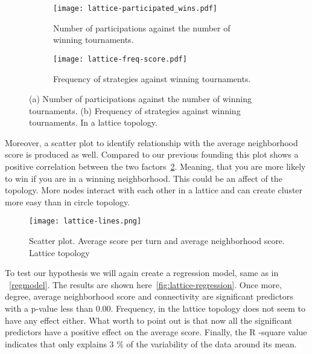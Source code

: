 \begin{figure}[h!]
\hspace*{-2cm}
    \begin{subfigure}[t]{1.2\textwidth}
    \centering
        \texttt{[image: lattice-participated\_wins.pdf]}
    \caption{Number of participations against the number of winning tournaments.}
    \end{subfigure}
\hfill
\hspace*{-2cm}
    \begin{subfigure}[t]{1.2\textwidth}\centering
    \centering
        \texttt{[image: lattice-freq-score.pdf]}
    \caption{Frequency of strategies against winning tournaments.}
    \end{subfigure}
\caption{(a) Number of participations against the number of winning tournaments.
         (b) Frequency of strategies against winning tournaments. In a lattice
         topology.}
\label{fig:lattice-part-wins}
\end{figure}

\newpage

Moreover, a scatter plot to identify relationship with the average neighborhood
score is produced as well. Compared to our previous founding this plot shows a positive
correlation between the two factors~\ref{fig:lattice-scatter-plot}. Meaning, that you are more
likely to win
if you are in a winning neighborhood. This could be an affect of the topology.
More nodes interact with each other in a lattice and can create cluster more easy
than in circle topology.

\begin{figure}[h!]
\centering
    \texttt{[image: lattice-lines.png]}
    \caption{Scatter plot. Average score per turn and average neighborhood score.
              Lattice topology}
    \label{fig:lattice-scatter-plot}
\end{figure}

To test our hypothesis we will again create a regression model, same as
in ~\ref{regmodel}. The results are shown here~\ref{fig:lattice-regression}.
Once more, degree, average neighborhood score and connectivity are significant
predictors with a p-value less than 0.00. Frequency, in the lattice topology
does not seem to have any effect either. What worth to point out is that
now all the significant predictors have a positive effect on the average score.
Finally, the R -square value indicates that only explains 3 \% of the variability
of the data around its mean.

